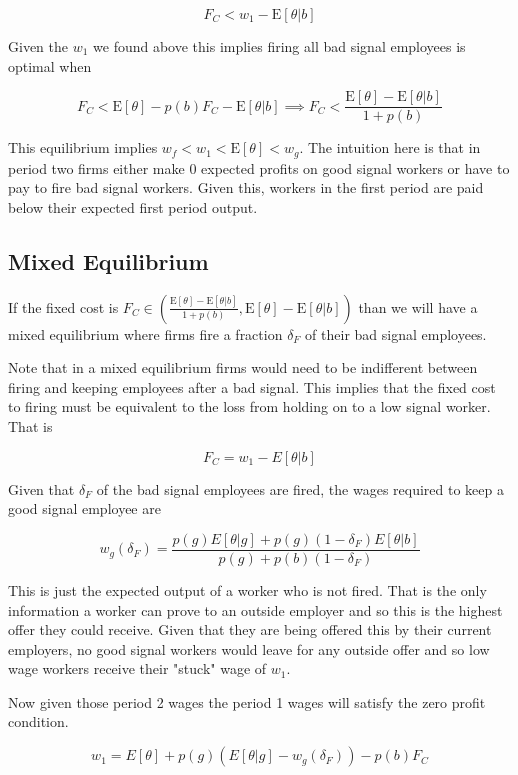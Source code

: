 \documentclass[11pt]{article}
\newcommand{\E}{\mathrm{E}}
\begin{document}
$$ F_C <  w_1 - \E[\theta|b] $$

Given the $w_1$ we found above this implies firing all bad signal employees is optimal when 

$$F_C <\E[\theta] - p(b) F_C - \E[\theta |b] \implies F_C < \frac{\E[\theta] - \E[\theta|b]}{1+p(b)}$$

This equilibrium implies $w_f < w_1 < \E[\theta] < w_g$. The intuition here is that in period two firms either make 0 expected profits on good signal workers or have to pay to fire bad signal workers. Given this, workers in the first period are paid below their expected first period output. 
 
\subsection{Mixed Equilibrium}

If the fixed cost is $F_C \in \left( \frac{\E[\theta] - \E[\theta|b]}{1+p(b)}, \E[\theta] - \E[\theta |b] \right)$ than we will have a mixed equilibrium where firms fire a fraction $\delta_F$ of their bad signal employees.\par 

Note that in a mixed equilibrium firms would need to be indifferent between firing and keeping employees after a bad signal. This implies that the fixed cost to firing must be equivalent to the loss from holding on to a low signal worker. That is 

$$ F_C = w_1 - E[\theta|b]$$

Given that $\delta_F$ of the bad signal employees are fired, the wages required to keep a good signal employee are 

$$ w_g(\delta_F) = \frac{p(g) E[\theta|g] + p(g) (1-\delta_F) E[\theta|b] }{ p(g) +p(b)(1-\delta_F) } $$

This is just the expected output of a worker who is not fired. That is the only information a worker can prove to an outside employer and so this is the highest offer they could receive. Given that they are being offered this by their current employers, no good signal workers would leave for any outside offer and so low wage workers receive their "stuck" wage of $w_1$. \par 

Now given those period 2 wages the period 1 wages will satisfy the zero profit condition. 

$$ w_1 = E[\theta] + p(g) \left( E[\theta | g]  - w_g(\delta_F) \right) - p(b) F_C$$
\end{document}
